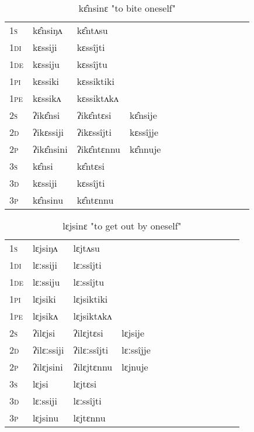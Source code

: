 \documentclass[oldfontcommands,oneside,a4paper,11pt]{article}
\begin{document}
\begin{table}[H]
\label{ɛt.vr} \centering 
\caption{kɛ̂nsinɛ  "to bite oneself"  }
\begin{tabular}{l|l|l|l|l|l|l|l|l|l|l|l|l}  \toprule
\textsc{1s} &kɛ̂nsiŋʌ &kɛ̂ntʌsu \\ 
\textsc{1di} &kɛssiji &kɛssîjti   \\
\textsc{1de} &kɛssiju &kɛssîjtu   \\ 
\textsc{1pi} &kɛssiki &kɛssiktiki   \\ 
\textsc{1pe} &kɛssikʌ &kɛssiktʌkʌ   \\ 
\textsc{2s} & ʔikɛ̂nsi & ʔikɛ̂ntɛsi &kɛ̂nsije  \\ 
\textsc{2d} & ʔikɛssiji & ʔikɛssîjti &kɛssîjje    \\
\textsc{2p} & ʔikɛ̂nsini  & ʔikɛ̂ntɛnnu &kɛ̂nnuje  \\ 
\textsc{3s} & kɛ̂nsi & kɛ̂ntɛsi   \\ 
\textsc{3d} & kɛssiji & kɛssîjti   \\ 
\textsc{3p} & kɛ̂nsinu  & kɛ̂ntɛnnu \\ 
\bottomrule
\end{tabular}
\end{table}


\begin{table}[H]
\label{ɛn.vr} \centering 
\caption{lɛjsinɛ  "to get out by oneself"  }
\begin{tabular}{l|l|l|l|l|l|l|l|l|l|l|l|l}  \toprule
\textsc{1s} &lɛjsiŋʌ &lɛjtʌsu \\ 
\textsc{1di} &lɛːssiji &lɛːssîjti   \\
\textsc{1de} &lɛːssiju &lɛːssîjtu   \\ 
\textsc{1pi} &lɛjsiki &lɛjsiktiki   \\ 
\textsc{1pe} &lɛjsikʌ &lɛjsiktʌkʌ   \\ 
\textsc{2s} & ʔilɛjsi & ʔilɛjtɛsi &lɛjsije  \\ 
\textsc{2d} & ʔilɛːssiji & ʔilɛːssîjti &lɛːssîjje    \\
\textsc{2p} & ʔilɛjsini  & ʔilɛjtɛnnu &lɛjnuje  \\ 
\textsc{3s} & lɛjsi & lɛjtɛsi   \\ 
\textsc{3d} & lɛːssiji & lɛːssîjti   \\ 
\textsc{3p} & lɛjsinu  & lɛjtɛnnu \\ 
\bottomrule
\end{tabular}
\end{table}
\end{document}
